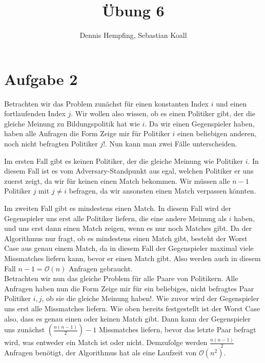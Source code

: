\documentclass[12pt]{scrartcl}%
\theoremstyle{nonumberplain}
\newcommand{\bO}[1]{\mathcal O(#1)}
\begin{document}
\author{Dennis Hempfing, Sebastian Koall}
\title{Übung 6}
\date{} 
\pagestyle{myheadings}

\maketitle %

\section*{Aufgabe 2}

Betrachten wir das Problem zunächst für einen konstanten Index $i$ und einen fortlaufenden Index $j$. Wir wollen also wissen, ob es einen Politiker gibt, der die gleiche Meinung zu Bildungspolitik hat wie $i$. Da wir einen Gegenspieler haben, haben alle Anfragen die Form \glqq Zeige mir für Politiker $i$ einen beliebigen anderen, noch nicht befragten Politiker $j$!\grqq. Nun kann man zwei Fälle unterscheiden. 

Im ersten Fall gibt es keinen Politiker, der die gleiche Meinung wie Politiker $i$. In diesem Fall ist es vom Adversary-Standpunkt aus egal, welchen Politiker er uns zuerst zeigt, da wir für keinen einen Match bekommen. Wir müssen alle $n-1$ Politiker $j$ mit $j \not= i$ befragen, da wir ansonsten einen Match verpassen könnten.

Im zweiten Fall gibt es mindestens einen Match. In diesem Fall wird der Gegenspieler uns erst alle Politiker liefern, die eine andere Meinung als $i$ haben, und uns erst dann einen Match zeigen, wenn es nur noch Matches gibt. Da der Algorithmus nur fragt, ob es mindestens einen Match gibt, besteht der Worst Case aus genau einem Match, da in diesem Fall der Gegenspieler maximal viele Missmatches liefern kann, bevor er einen Match gibt. Also werden auch in diesem Fall $n-1 = \bO{n}$ Anfragen gebraucht.\\

Betrachten wir nun das gleiche Problem für alle Paare von Politikern. Alle Anfragen haben nun die Form \glqq Zeige mir für ein beliebiges, nicht befragtes Paar Politiker $i, j$, ob sie die gleiche Meinung haben!\grqq. Wie zuvor wird der Gegenspieler uns erst alle Missmatches liefern. Wie oben bereits festgestellt ist der Worst Case also, dass es genau einen oder keinen Match gibt. Dann kann der Gegenspieler uns zunächst $(\frac{n(n-1)}{2})-1$ Missmatches liefern, bevor das letzte Paar befragt wird, was entweder ein Match ist oder nicht. Demzufolge werden $\frac{n(n-1)}{2}$ Anfragen benötigt, der Algorithmus hat als eine Laufzeit von $\bO{n^2}$.
\end{document}
